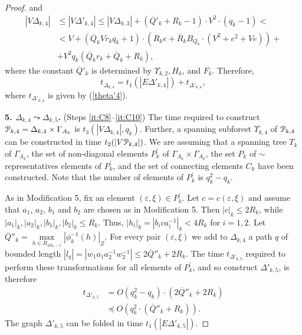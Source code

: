 \documentclass[a4paper,12pt]{article}
\newcommand{\G}{\Gamma }
\newcommand{\D}{\Delta }
\newcommand{\e}{\varepsilon }
\newcommand{\U}{\Upsilon }
\newcommand{\cP}{{\cal{P}}}
\numberwithin{equation}{section}
\numberwithin{figure}{section}
\begin{document}
\begin{proof}
and
\begin{equation}\label{vtheta4}
\begin{split}
|V\D_{k,4}| &\le |V \D'_{k,4}| \le |V \D_{k,3}| +(\overline{Q}'_k+R_k-1)\cdot
V^2 \cdot(q_k-1)<\\
&< V + (\overline{Q}_k V r_kq_k +1)\cdot(R_k e +\overline{R}_k B_{Q_k}
 \cdot(V^2 + e^2 + V e)) +\\
& + V^2 q_k (\overline{Q}_k r_k +\overline{Q}_k +R_k) ,
\end{split}
\end{equation}
where the constant $\overline{Q}'_k$ is determined by $\U_{k,2}, H_k$, and
$F_k$.
Therefore,
\begin{equation}\label{theta4}
t_{\D_{k,4}} = t_1(|E\D'_{k,4}|) + t_{\D'_{k,4}},
\end{equation}
where $t_{\D'_{k,4}}$ is given by (\ref{theta'4}).

{\bf 5. $\D_{k,4} \leadsto \D_{k,5}$.} (Steps \ref{it:C8}--\ref{it:C10}) The time required to construct
$\cP_{k,4}=\D_{k,4}\times \G_{A_k}$ is $t_3(|V \D_{k,4}|, q_k)$. Further,
 a spanning subforest $\U_{k,4}$ of $\cP_{k,4}$ can be constructed in time
$t_2(|V\cP_{k,4}|)$. We are assuming that  a spanning tree $T_k$ of
$\G_{A_k}$, the set of non-diagonal elements $P_k^\prime$ of
$\G_{A_k}\times \G_{A_k}$, the set $P_k$ of $\sim$ representatives
elements of $P_k^\prime$, and the set of connecting elements
 $C_k$ have been constructed. Note that the number of elements of $P_k^\prime$ is
$q_k^2-q_k$.



As in Modification 5, fix an element $(\e,\xi)\in P_k^\prime$.
Let $c=c(\e,\xi)$ and assume that $a_1$, $a_2$, $b_1$
and $b_2$  are chosen as in Modification 5. Then $|c|_k\le 2R_k$,
while $|a_1|_k, |a_2|_k, |b_1|_k,|b_2|_k \le R_k$.
Thus, $|h_i|_k = |b_ica_i^{-1}|_k < 4R_k$ for
$i=1,2$. Let $\overline{Q}''_k=\max\limits_{h \in
B_{4R_k-1}}|\phi^{-1}_k(h)|_Z$. For every pair $(\e,\xi) $ we add
to $\D_{k,4}$ a path $q$ of bounded length $|l_q|= |w_1 a_1a_2^{-1}
w_2^{-1}| \le 2 \overline{Q}''_k +2 R_k$.
The time $t_{\D'_{k,5}}$ required to perform
these transformations for all elements of $P_k^\prime$, and
so construct $\D'_{k,5}$, is therefore
\begin{equation}\label{theta'5}
\begin{split}
t_{\D'_{k,5}} &= O(q_k^2-q_k)\cdot(2\overline{Q}''_k+2R_k)\\
&\preceq O(q_k^2 \cdot (\overline{Q}''_k+R_k)).
\end{split}
\end{equation}
The graph $\D'_{k,5}$ can be folded in time $t_1(|E\D'_{k,5}|)$.


\end{proof}
\end{document}
